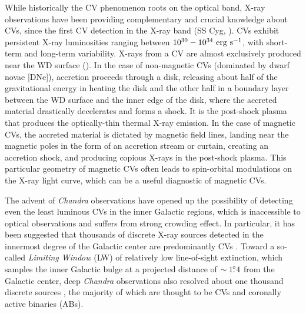 \documentclass[fleqn,usenatbib]{mnras}
\begin{document}
While historically the CV phenomenon roots on the optical band, X-ray observations have been providing complementary and crucial knowledge about CVs, since the first CV detection in the X-ray band (SS Cyg, \citealp{1974ApJ...187L...5R,1978ApJ...224..953S}). 
CVs exhibit persistent X-ray luminosities ranging between $10^{30}-10^{34}\rm~erg~s^{-1}$, with short-term and long-term variability. 
X-rays from a CV are almost exclusively produced near the WD surface (\citealp{2001cvs..book.....H, 2017PASP..129f2001M}). 
In the case of non-magnetic CVs (dominated by dwarf novae [DNe]), accretion proceeds through a disk, releasing about half of the gravitational energy in heating the disk and the other half in a boundary layer between the WD surface and the inner edge of the disk, where the accreted material drastically decelerates and forms a shock. It is the post-shock plasma that produces the optically-thin thermal X-ray emission.
In the case of magnetic CVs, the accreted material is dictated by magnetic field lines, landing near the magnetic poles in the form of an accretion stream or curtain, creating an accretion shock, and producing copious X-rays in the post-shock plasma. 
This particular geometry of magnetic CVs often leads to spin-orbital modulations on the X-ray light curve, which can be a useful diagnostic of magnetic CVs. 

The advent of {\it Chandra} observations have opened up the possibility of detecting even the least luminous CVs in the inner Galactic regions, which is inaccessible to optical observations and suffers from strong crowding effect. 
In particular, it has been suggested that thousands of discrete X-ray sources detected in the innermost degree of the Galactic center are predominantly CVs \citep{2002Natur.415..148W,2003ApJ...589..225M,2006ApJS..165..173M,2009ApJS..181..110M,2018ApJS..235...26Z}. 
Toward a so-called {\it Limiting Window} (LW) of relatively low line-of-sight extinction, which samples the inner Galactic bulge at a projected distance of $\sim1{\hbox{$.\!\!^\circ$}}4$ from the Galactic center, deep {\it Chandra} observations also resolved about one thousand discrete sources  \citep{2009Natur.458.1142R}, the majority of which are thought to be CVs and coronally active binaries (ABs). 
\end{document}
